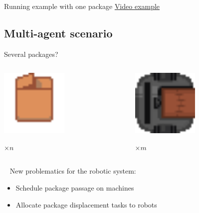 \begin{frame}{Running example with one package}
    \LARGE
    \centering
    \href{https://youtu.be/a4_tITUTQuQ}{Video example}
\end{frame}

\subsection{Multi-agent scenario}

\begin{frame}{Several packages?}
    \begin{columns}
        \begin{column}{0.5\textwidth}
            \centering
            \includegraphics[width = 0.5\textwidth]{images/godot/package.png}
            
            \Large $\times n$
        \end{column}
        \begin{column}{0.5\textwidth}
            \centering
            \includegraphics[width = 0.5\textwidth]{images/godot/robot_texture.png}
            
            \LARGE $\times m$
        \end{column}
    \end{columns}
    
    ~
\pause
    New problematics for the robotic system:
    \begin{itemize}
        \pause
        \item Schedule package passage on machines
        \pause
        \item Allocate package displacement tasks to robots
    \end{itemize}

    \centering
\end{frame}

